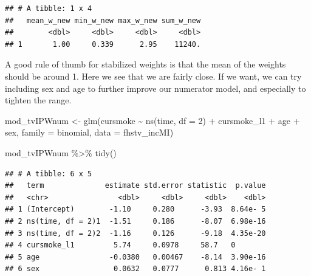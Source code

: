 \documentclass[
]{book}
\newenvironment{Shaded}{\begin{snugshade}}{\end{snugshade}}
\newcommand{\AttributeTok}[1]{\textcolor[rgb]{0.77,0.63,0.00}{#1}}
\newcommand{\DecValTok}[1]{\textcolor[rgb]{0.00,0.00,0.81}{#1}}
\newcommand{\FunctionTok}[1]{\textcolor[rgb]{0.00,0.00,0.00}{#1}}
\newcommand{\NormalTok}[1]{#1}
\newcommand{\OtherTok}[1]{\textcolor[rgb]{0.56,0.35,0.01}{#1}}
\newcommand{\SpecialCharTok}[1]{\textcolor[rgb]{0.00,0.00,0.00}{#1}}
\begin{document}
\begin{verbatim}
## # A tibble: 1 x 4
##   mean_w_new min_w_new max_w_new sum_w_new
##        <dbl>     <dbl>     <dbl>     <dbl>
## 1       1.00     0.339      2.95    11240.
\end{verbatim}

A good rule of thumb for stabilized weights is that the mean of the weights should be around 1. Here we see that we are fairly close. If we want, we can try including sex and age to further improve our numerator model, and especially to tighten the range.

\begin{Shaded}
\begin{Highlighting}[]
\NormalTok{mod\_tvIPWnum }\OtherTok{\textless{}{-}} \FunctionTok{glm}\NormalTok{(cursmoke }\SpecialCharTok{\textasciitilde{}} \FunctionTok{ns}\NormalTok{(time, }\AttributeTok{df =} \DecValTok{2}\NormalTok{) }\SpecialCharTok{+}\NormalTok{ cursmoke\_l1 }\SpecialCharTok{+} 
\NormalTok{                      age }\SpecialCharTok{+}\NormalTok{ sex, }\AttributeTok{family =}\NormalTok{ binomial, }
                    \AttributeTok{data =}\NormalTok{ fhstv\_incMI)}

\NormalTok{mod\_tvIPWnum }\SpecialCharTok{\%\textgreater{}\%}
  \FunctionTok{tidy}\NormalTok{()}
\end{Highlighting}
\end{Shaded}

\begin{verbatim}
## # A tibble: 6 x 5
##   term              estimate std.error statistic  p.value
##   <chr>                <dbl>     <dbl>     <dbl>    <dbl>
## 1 (Intercept)        -1.10     0.280      -3.93  8.64e- 5
## 2 ns(time, df = 2)1  -1.51     0.186      -8.07  6.98e-16
## 3 ns(time, df = 2)2  -1.16     0.126      -9.18  4.35e-20
## 4 cursmoke_l1         5.74     0.0978     58.7   0       
## 5 age                -0.0380   0.00467    -8.14  3.90e-16
## 6 sex                 0.0632   0.0777      0.813 4.16e- 1
\end{verbatim}
\end{document}

